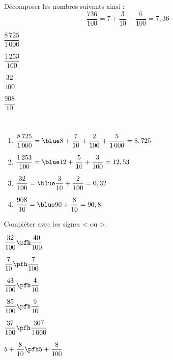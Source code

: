 \begin{colonne*exercice}
\bigskip

\begin{exercice} %
   Décomposer les nombres suivants ainsi : $$\frac{736}{100} =7+\frac{3}{10}+\frac{6}{100} =7,36$$
   \begin{colenumerate}{4}
      \item $\dfrac{8\,725}{1\,000}$
      \item $\dfrac{1\,253}{100}$
      \item $\dfrac{32}{100}$
      \item $\dfrac{908}{10}$
   \end{colenumerate}
\end{exercice}

\begin{corrige}
   \ \\ [-5mm]
   \begin{enumerate}
      \item $\dfrac{8\,725}{1\,000} =\blue 8+\dfrac{7}{10}+\dfrac{2}{100}+\dfrac{5}{1\,000} =8,725$ \medskip
      \item $\dfrac{1\,253}{100} =\blue 12+\dfrac{5}{10}+\dfrac{3}{100} =12,53$ \medskip
      \item $\dfrac{32}{100} =\blue \dfrac{3}{10}+\dfrac{2}{100} =0,32$ \medskip
      \item $\dfrac{908}{10} =\blue 90+\dfrac{8}{10} =90,8$
   \end{enumerate}
\end{corrige}

\bigskip


\begin{exercice} %
   Compléter avec les signes < ou >. \bigskip
   \begin{colenumerate}{2}
      \item $\dfrac{32}{100} \pfh \dfrac{40}{100}$ \bigskip
      \item $\dfrac{7}{10} \pfh \dfrac{7}{100}$ \bigskip
      \item $\dfrac{43}{100} \pfh \dfrac{4}{10}$ \bigskip
      \item $\dfrac{85}{100} \pfh \dfrac{9}{10}$
      \item $\dfrac{37}{100} \pfh \dfrac{307}{1\,000}$
      \item $5+\dfrac{8}{10} \pfh 5+\dfrac{8}{100}$
   \end{colenumerate}
\end{exercice}


\end{colonne*exercice}
